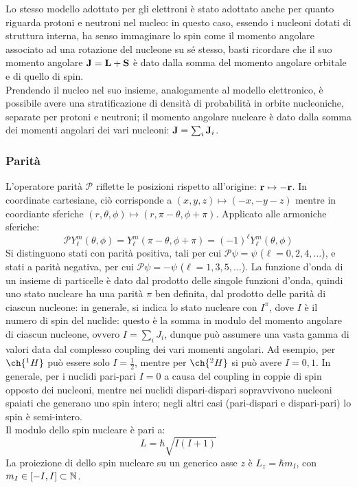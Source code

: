 Lo stesso modello adottato per gli elettroni è stato adottato anche per quanto riguarda protoni e neutroni nel nucleo: in questo caso, essendo i nucleoni dotati di struttura interna, ha senso immaginare lo spin come il momento angolare associato ad una rotazione del nucleone su sé stesso, basti ricordare che il suo momento angolare $ \mathbf{J} = \mathbf{L} + \mathbf{S} $ è dato dalla somma del momento angolare orbitale e di quello di spin.\\
Prendendo il nucleo nel suo insieme, analogamente al modello elettronico, è possibile avere una stratificazione di densità di probabilità in orbite nucleoniche, separate per protoni e neutroni; il momento angolare nucleare è dato dalla somma dei momenti angolari dei vari nucleoni: $ \mathbf{J} = \sum_i \mathbf{J}_i $.

\subsubsection{Parità}

L'operatore parità $ \mathcal{P} $ riflette le posizioni rispetto all'origine: $ \mathbf{r} \mapsto -\mathbf{r} $. In coordinate cartesiane, ciò corrisponde a $ (x,y,z) \mapsto (-x,-y-z) $ mentre in coordiante sferiche $ (r,\theta,\phi) \mapsto (r,\pi-\theta,\phi+\pi) $. Applicato alle armoniche sferiche:
\begin{equation}
	\mathcal{P}Y_{\ell}^m(\theta,\phi) = Y_{\ell}^m(\pi-\theta,\phi+\pi) = \left( -1 \right)^{\ell} Y_{\ell}^m(\theta,\phi)
	\label{eq:1.33}
\end{equation}
Si distinguono stati con parità positiva, tali per cui $ \mathcal{P}\psi = \psi $ ($ \ell = 0,2,4,\dots $), e stati a parità negativa, per cui $ \mathcal{P}\psi = -\psi $ ($ \ell = 1,3,5,\dots $). La funzione d'onda di un insieme di particelle è dato dal prodotto delle singole funzioni d'onda, quindi uno stato nucleare ha una parità $ \pi $ ben definita, dal prodotto delle parità di ciascun nucleone: in generale, si indica lo stato nucleare con $ I^{\pi} $, dove $ I $ è il numero di spin del nuclide: questo è la somma in modulo del momento angolare di ciascun nucleone, ovvero $ I = \sum_i J_i $, dunque può assumere una vasta gamma di valori data dal complesso coupling dei vari momenti angolari.
Ad esempio, per $ \ch{^1 H} $ può essere solo $ I = \frac{1}{2} $, mentre per $ \ch{^2 H} $ si può avere $ I = 0,1 $. In generale, per i nuclidi pari-pari $ I = 0 $ a causa del coupling in coppie di spin opposto dei nucleoni, mentre nei nuclidi dispari-dispari sopravvivono nucleoni spaiati che generano uno spin intero; negli altri casi (pari-dispari e dispari-pari) lo spin è semi-intero.\\
Il modulo dello spin nucleare è pari a:
\begin{equation}
	L = \hbar \sqrt{I(I+1)}
	\label{eq:1.34}
\end{equation}
La proiezione di dello spin nucleare su un generico asse $ z $ è $ L_z = \hbar m_I $, con $ m_I \in \left[ -I, I \right] \subset \mathbb{N} $.

